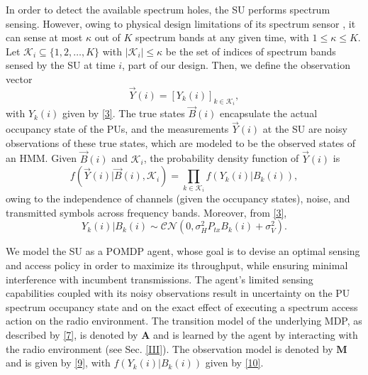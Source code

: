 \documentclass[10pt,twocolumn]{IEEEtran}
\begin{document}
In order to detect the available spectrum holes, the SU performs spectrum sensing. However, owing to physical design limitations of its spectrum sensor \cite{5990482}, it can sense at most $\kappa$ out of $K$ spectrum bands at any given time, with $1{\leq}\kappa{\leq}K$. Let $\mathcal K_{i}{\subseteq}\{1,2,\dots,K\}$ with $|\mathcal K_i|{\leq}\kappa$ be the set of indices of spectrum bands sensed by the SU at time $i$, part of our design.
Then, we define the observation vector
\begin{equation}\label{8}
    \vec{Y}(i) = [Y_k(i)]_{k {\in} \mathcal K_i},
\end{equation}
with $Y_k(i)$ given by \eqref{3}.
The true states $\vec{B}(i)$ encapsulate the actual occupancy state of the PUs, and the measurements $\vec{Y}(i)$ at the SU are noisy observations of these true states, which are modeled to be the observed states of an HMM. Given $\vec{B}(i)$ and $\mathcal K_i$, the probability density function of $\vec{Y}(i)$ is
\begin{equation}\label{9}
    f(\vec{Y}(i)|\vec{B}(i), \mathcal K_i) = \prod_{k \in \mathcal K_i} f(Y_k(i)|B_k(i)),
\end{equation}
owing to the independence of channels (given the occupancy states), noise, and transmitted symbols across frequency bands. Moreover, from \eqref{3},
\begin{equation}\label{10}
 Y_k(i)|B_k(i) \sim \mathcal{CN}(0, \sigma_H^2P_{tx}B_k(i) + \sigma_V^2).
\end{equation}

We model the SU as a POMDP agent, whose goal is to devise an optimal sensing and access policy in order to maximize its throughput, while ensuring minimal interference with incumbent transmissions. The agent's limited sensing capabilities coupled with its noisy observations result in uncertainty on the PU spectrum occupancy state and on the exact effect of executing a spectrum access action on the radio environment. The transition model of the underlying MDP, as described by \eqref{7}, is denoted by $\mathbf{A}$ and is learned by the agent by interacting with the radio environment (see Sec. \ref{III}). The observation model is denoted by $\mathbf{M}$ and is given by \eqref{9}, with $f(Y_k(i)|B_k(i))$ given by \eqref{10}. 
\end{document}
